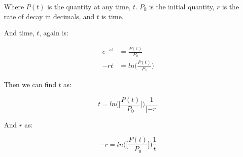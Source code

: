 \documentclass[12pt, UTF8]{article}
\begin{document}
	Where $P(t)$ is the quantity at any time, $t$. $P_{0}$ is the initial quantity, $r$ is the rate of decay in decimals, and $t$ is time.
	
	And time, $t$, again is:
	
	\begin{align}
		e^{-rt} &= \frac{P(t)}{P_{0}}  \nonumber \\
		-rt &= ln\big(\frac{P(t)}{P_{0}}\big)  \nonumber 
	\end{align}
	
	Then we can find $t$ as:
	
	\begin{equation}
		t = ln\big(\big[\frac{P(t)}{P_{0}}\big]\big) \frac{1}{|-r|}
	\end{equation}
	
	And $r$ as:
	
	\begin{equation}
		-r = ln\big(\big[\frac{P(t)}{P_{0}}\big]\big) \frac{1}{t}
	\end{equation}
\end{document}
